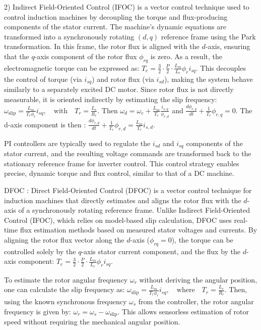 \documentclass[../main.tex]{subfiles}
\begin{document}
2)
Indirect Field-Oriented Control (IFOC) is a vector control technique used to control induction machines by decoupling the torque and flux-producing components of the stator current. The machine's dynamic equations are transformed into a synchronously rotating $(d,q)$ reference frame using the Park transformation. In this frame, the rotor flux is aligned with the $d$-axis, ensuring that the $q$-axis component of the rotor flux $\phi_{rq}$ is zero. As a result, the electromagnetic torque can be expressed as: $T_e = \frac{3}{2} \cdot \frac{P}{2} \cdot \frac{L_m}{L_r} \phi_r i_{sq}$. 
This decouples the control of torque (via $i_{sq}$) and rotor flux (via $i_{sd}$), making the system behave similarly to a separately excited DC motor.
Since rotor flux is not directly measurable, it is oriented indirectly by estimating the slip frequency: $\omega_{\text{slip}} = \frac{L_m}{T_r \phi_r} i_{sq}, \quad \text{with} \quad T_r = \frac{L_r}{R_r}$. Then $\omega_d = \omega_e + \frac{L_m}{T_r} \frac{i_{s,q}}{\phi_{r,d}}$ and $\frac{d\phi_{r,q}}{dt} + \frac{1}{T_r} \phi_{r,q} = 0$. The d-axis component is then : $\frac{d\phi_{r,d}}{dt} + \frac{1}{T_r} \phi_{r,d} = \frac{L_m}{T_r} i_{s,d}$.

PI controllers are typically used to regulate the $i_{sd}$ and $i_{sq}$ components of the stator current, and the resulting voltage commands are transformed back to the stationary reference frame for inverter control. This control strategy enables precise, dynamic torque and flux control, similar to that of a DC machine.


DFOC : 
Direct Field-Oriented Control (DFOC) is a vector control technique for induction machines that directly estimates and aligns the rotor flux with the $d$-axis of a synchronously rotating reference frame. Unlike Indirect Field-Oriented Control (IFOC), which relies on model-based slip calculation, DFOC uses real-time flux estimation methods based on measured stator voltages and currents.
By aligning the rotor flux vector along the $d$-axis ($\phi_{rq} = 0$), the torque can be controlled solely by the $q$-axis stator current component, and the flux by the $d$-axis component: $T_e = \frac{3}{2} \cdot \frac{P}{2} \cdot \frac{L_m}{L_r} \phi_r i_{sq}$.

To estimate the rotor angular frequency $\omega_r$ without deriving the angular position, one can calculate the slip frequency as: $\omega_{\text{slip}} = \frac{L_m}{T_r \phi_r} i_{sq}, \quad \text{where} \quad T_r = \frac{L_r}{R_r}$.
Then, using the known synchronous frequency $\omega_s$ from the controller, the rotor angular frequency is given by: $\omega_r = \omega_s - \omega_{\text{slip}}$.
This allows sensorless estimation of rotor speed without requiring the mechanical angular position.
\end{document}
